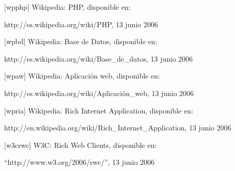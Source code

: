\documentclass[12pt,letterpaper,oneside]{article}
\begin{document}
\bigskip

[wpphp] Wikipedia: PHP, disponible en:

{\textquotedbl}http://es.wikipedia.org/wiki/PHP{\textquotedbl}, 13 junio
2006


\bigskip

[wpbd] Wikipedia: Base de Datos, disponible en:

{\textquotedbl}http://es.wikipedia.org/wiki/Base\_de\_datos{\textquotedbl},
13 junio 2006


\bigskip

[wpaw] Wikipedia: Aplicación web, disponible en:

{\textquotedbl}http://es.wikipedia.org/wiki/Aplicación\_web{\textquotedbl},
13 junio 2006

[wpria] Wikipedia: Rich Internet Application, disponible en:

{\textquotedbl}http://en.wikipedia.org/wiki/Rich\_Internet\_Application{\textquotedbl},
13 junio 2006


\bigskip

[w3crwc] W3C: Rich Web Clients, disponible en:

``http://www.w3.org/2006/rwc/'', 13 junio 2006
\end{document}
